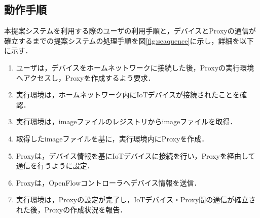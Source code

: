 \documentclass[Japanese]{dicomopapers}
\begin{document}
\subsection{動作手順}
本提案システムを利用する際のユーザの利用手順と，デバイスとProxyの通信が確立するまでの提案システムの処理手順を図\ref{fig:seaquence}に示し，詳細を以下に示す．
\begin{enumerate}
	\item ユーザは，デバイスをホームネットワークに接続した後，Proxyの実行環境へアクセスし，Proxyを作成するよう要求．
	\item 実行環境は，ホームネットワーク内にIoTデバイスが接続されたことを確認．
	\item 実行環境は，imageファイルのレジストリからimageファイルを取得．
	\item 取得したimageファイルを基に，実行環境内にProxyを作成．
	\item Proxyは，デバイス情報を基にIoTデバイスに接続を行い，Proxyを経由して通信を行うように設定．
	\item Proxyは，OpenFlowコントローラへデバイス情報を送信．
	\item 実行環境は，Proxyの設定が完了し，IoTデバイス・Proxy間の通信が確立された後，Proxyの作成状況を報告．
\end{enumerate}



\end{document}
